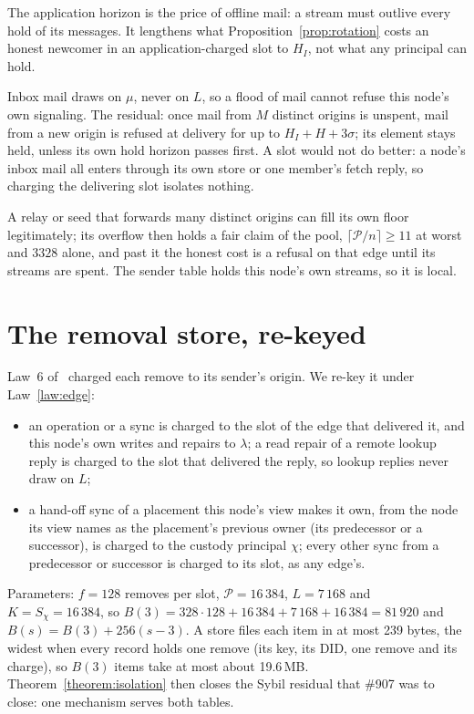 \documentclass[journal]{IEEEtran}
\newcommand{\Pool}{\mathcal{P}}
\newcommand{\issue}[1]{\#{#1}}
\begin{document}
The application horizon is the price of offline mail: a stream must outlive every hold of its
messages.  It lengthens what Proposition~\ref{prop:rotation} costs an honest newcomer in an
application-charged slot to $H_I$, not what any principal can hold.

Inbox mail draws on $\mu$, never on $L$, so a flood of mail cannot refuse this node's
own signaling.  The residual: once mail from $M$ distinct origins is unspent, mail from a new
origin is refused at delivery for up to $H_I+H+3\sigma$; its element stays held, unless its own
hold horizon passes first.  A slot would not do better: a node's inbox mail all enters through
its own store or one member's fetch reply, so charging the delivering slot isolates nothing.

A relay or seed that forwards many distinct origins can fill its own floor legitimately; its
overflow then holds a fair claim of the pool, $\lceil\Pool/n\rceil\ge11$ at worst and $3328$
alone, and past it the honest cost is a refusal on that edge until its streams are spent.  The sender table holds this node's own streams, so it is local.

\section{The removal store, re-keyed}\label{sec:removal}

Law~6 of~\cite{RemovalStability} charged each remove to its sender's origin.  We re-key it
under Law~\ref{law:edge}:
\begin{itemize}[leftmargin=1.2em]
\item an operation or a sync is charged to the slot of the edge that delivered it, and this
node's own writes and repairs to $\lambda$; a read repair of a remote lookup reply is charged to
the slot that delivered the reply, so lookup replies never draw on $L$;
\item a hand-off sync of a placement this node's view makes it own, from the node its view names
as the placement's previous owner (its predecessor or a successor), is charged to the custody
principal $\chi$; every other sync from a predecessor or successor is charged to its slot, as
any edge's.
\end{itemize}
Parameters: $f=128$ removes per slot, $\Pool=16\,384$, $L=7\,168$ and $K=S_\chi=16\,384$, so
$B(3)=328\cdot128+16\,384+7\,168+16\,384=81\,920$ and $B(s)=B(3)+256(s-3)$.  A store files
each item in at most 239 bytes, the widest when every record holds one remove (its key, its
DID, one remove and its charge), so $B(3)$ items take at most about 19.6\,MB.
Theorem~\ref{theorem:isolation} then closes the Sybil residual that \issue{907} was to close: one
mechanism serves both tables.
\end{document}
